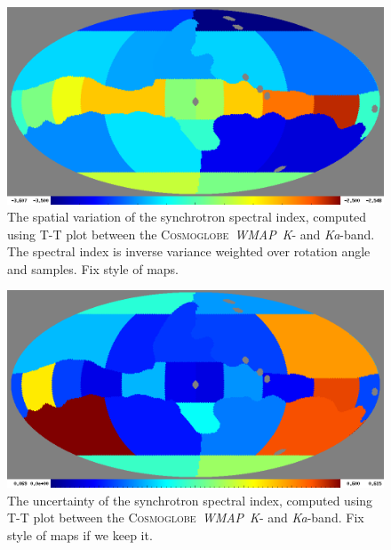 \documentclass[twocolumn]{../../common/aa}
\def\WMAP{\emph{WMAP}}
\newcommand{\red}[0]{\color{red}}
\newcommand{\Cosmoglobe}{\textsc{Cosmoglobe}}
\newcommand{\K}[0]{\textit K}
\newcommand{\Ka}[0]{\textit{Ka}}
\begin{document}
\begin{figure}
	\centering
	\includegraphics[width=\linewidth]{figures/ut_spectral_index_scatter_alphamean_1.png}
	\caption{The spatial variation of the synchrotron spectral index, computed using T-T plot between the \Cosmoglobe\ \WMAP\ \K- and \Ka-band. The spectral index is inverse variance weighted over rotation angle and samples. {\red Fix style of maps.}}
        \label{fig:beta_map}
\end{figure}

\begin{figure}
	\centering
	\includegraphics[width=\linewidth]{figures/ut_uncert_scatter_alphamean_1.png}
	\caption{The uncertainty of the synchrotron spectral index, computed using T-T plot between the \Cosmoglobe\ \WMAP\ \K- and \Ka-band. {\red Fix style of maps if we keep it.}}
        \label{fig:uncert_map}
\end{figure}
\end{document}
